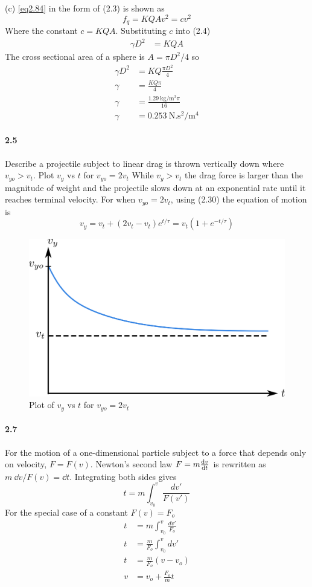\documentclass[../problems.tex]{subfiles}
\begin{document}
(c) \eqref{eq2.84} in the form of (2.3) is shown as
\begin{equation*}
    f_q = KQAv^2 = cv^2
\end{equation*}
Where the constant $c = KQA$. Substituting $c$ into (2.4)
\begin{align*}
    \gamma D^2 &= KQA
\end{align*}
The cross sectional area of a sphere is $A = \pi D^2/4$ so
\begin{align*}
    \gamma D^2 &= KQ\frac{\pi D^2}{4} \\
    \gamma &= \frac{KQ\pi}{4} \\
    \gamma &= \frac{\qty{1.29}{\kg \per \m^3} \pi}{16} \\
    \gamma &= \qty{0.253}{\N.\s^2\per\m^4}
\end{align*}

\paragraph{2.5} Describe a projectile subject to linear drag is thrown vertically down where
$v_{yo} > v_t$.
Plot $v_y$ vs $t$ for $v_{yo} = 2 v_t$ 
\barh
While $v_y > v_t$ the drag force is larger than the magnitude of weight and the projectile slows
down at an exponential rate until it reaches terminal velocity.
For when $v_{yo} = 2 v_t$, using (2.30) the equation of motion is
\begin{equation*}
    v_y = v_t + (2v_t - v_t)e^{t/\tau} = v_t(1 + e^{-t/\tau})
\end{equation*}

\begin{figure}[h]
    \centering
    \includegraphics[width=0.5\linewidth]{fig2_5.png}
    \caption{Plot of $v_y$ vs $t$ for $v_{yo} = 2 v_t$}
    \label{fig:2_5}
\end{figure}

\paragraph{2.7} For the motion of a one-dimensional particle subject to a force that depends only on
velocity, $F = F(v)$. Newton's second law $F = m \dv{v}{t}$ is rewritten as $m\:\dd v/F(v) = \dd t$.
Integrating both sides gives
\begin{equation*}
    t = m \int_{v_0}^v \frac{dv'}{F(v')}
\end{equation*}
\barh
For the special case of a constant $F(v) = F_o$
\begin{align*}
    t &= m \int_{v_0}^v \frac{dv'}{F_o} \\
    t &= \frac{m}{F_o} \int_{v_0}^v dv' \\
    t &= \frac{m}{F_o} (v-v_o) \\
    v &= v_o + \frac{F_o}{m} t
\end{align*}
\end{document}
